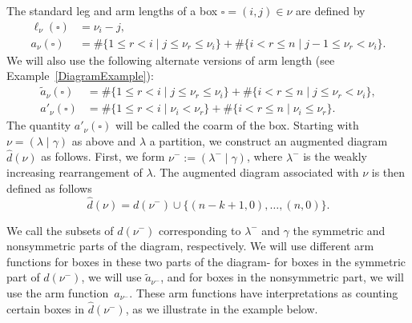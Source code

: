 \documentclass[ALCO]{cedram}
\newcommand{\leg}[1]{{\ell_{#1}(\square)}}
\newcommand{\armonenu}{{\widetilde{a}_\nu(\square)}}
\newcommand{\armtwonu}{{a_\nu(\square)}}
\newcommand{\dg}{d}
\newcommand{\dga}{\widehat{\dg}}
\begin{document}
The standard leg and arm lengths of a box $\square=(i,j)\in\nu$ are defined by
\begin{align*}
\leg{\nu} &= \nu_i -j,\\
\armtwonu &= \# \{ 1 \leq r < i \mid j\leq \nu_r \leq \nu_i\} + \# \{ i<r \leq n \mid j-1\leq \nu_r < \nu_i\}.
\end{align*}
We will also use the following alternate versions of arm length (see Example~\ref{DiagramExample}):
\begin{align*}
\armonenu &= \# \{1\leq r < i \mid j \leq \nu_r \leq \nu_i \} + \# \{i<r \leq n \mid j \leq \nu_r < \nu_i \}, \\
a'_\nu(\square) &= \# \{1\leq r<i \mid \nu_i < \nu_r \} + \# \{i<r \leq n \mid \nu_i \leq \nu_r \}.\end{align*}
The quantity $a'_\nu(\square)$ will be called the coarm of the box. Starting with $\nu=(\lambda \mid \gamma)$ as above and $\lambda$ a partition, we construct an augmented diagram $\dga(\nu)$ as follows. First, we form $\nu^- := (\lambda^- \mid \gamma)$, where $\lambda^-$ is the weakly increasing rearrangement of $\lambda$. The augmented diagram associated with $\nu$ is then defined as follows
\[ \dga(\nu)=\dg(\nu^-)\cup \{(n-k+1,0),\dotsc,(n,0)\}. \]

We call the subsets of $\dg(\nu^-)$ corresponding to $\lambda^-$ and $\gamma$ the symmetric and nonsymmetric parts of the diagram, respectively. We will use different arm functions for boxes in these two parts of the diagram- for boxes in the symmetric part of $\dg(\nu^-)$, we will use $\widetilde{a}_{\nu^-}$, and for boxes in the nonsymmetric part, we will use the arm function~$a_{\nu^-}$. These arm functions have interpretations as counting certain boxes in $\dga(\nu^-)$, as we illustrate in the example below. 
\end{document}
